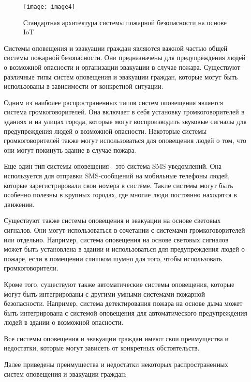 \begin{figure}[H]
  \centering
  \texttt{[image: image4]}
  \caption{Стандартная архитектура системы пожарной безопасности на основе IoT}
\end{figure}

\begin{multicols}{2}

Системы оповещения и эвакуации граждан являются важной частью общей
системы пожарной безопасности. Они предназначены для предупреждения
людей о возможной опасности и организации эвакуации в случае пожара.
Существуют различные типы систем оповещения и эвакуации граждан, которые
могут быть использованы в зависимости от конкретной ситуации.

Одним из наиболее распространенных типов систем оповещения является
система громкоговорителей. Она включает в себя установку
громкоговорителей в зданиях и на улицах города, которые могут
воспроизводить звуковые сигналы для предупреждения людей о возможной
опасности. Некоторые системы громкоговорителей также могут
использоваться для оповещения людей о том, что они могут покинуть здание
в случае пожара.

Еще один тип системы оповещения - это система SMS-уведомлений. Она
используется для отправки SMS-сообщений на мобильные телефоны людей,
которые зарегистрировали свои номера в системе. Такие системы могут быть
особенно полезны в крупных городах, где многие люди постоянно находятся
в движении.

Существуют также системы оповещения и эвакуации на основе световых
сигналов. Они могут использоваться в сочетании с системами
громкоговорителей или отдельно. Например, система оповещения на основе
световых сигналов может быть установлена в здании и использоваться для
предупреждения людей о пожаре, если в помещении слишком шумно для того,
чтобы использовать громкоговорители.

Кроме того, существуют также автоматические системы оповещения, которые
могут быть интегрированы с другими умными системами пожарной
безопасности. Например, система детектирования пожара на основе дыма
может быть интегрирована с системой оповещения для автоматического
предупреждения людей в здании о возможной опасности.

Все системы оповещения и эвакуации граждан имеют свои преимущества и
недостатки, которые могут зависеть от конкретных обстоятельств.

Далее приведены преимущества и недостатки некоторых распространенных
систем оповещения и эвакуации граждан:


\end{multicols}
